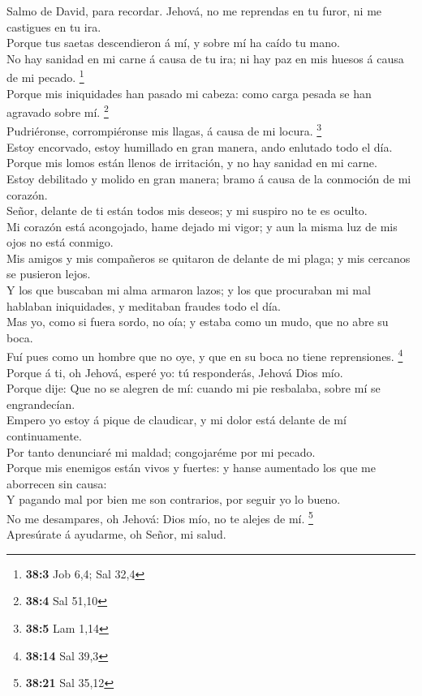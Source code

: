  Salmo de David, para recordar. Jehová, no me reprendas en
tu furor, ni me castigues en tu ira.\\
 Porque tus saetas descendieron á mí, y sobre mí ha caído
tu mano.\\
 No hay sanidad en mi carne á causa de tu ira; ni hay paz
en mis huesos á causa de mi pecado. \footnote{\textbf{38:3} Job 6,4; Sal
  32,4}\\
 Porque mis iniquidades han pasado mi cabeza: como carga
pesada se han agravado sobre mí. \footnote{\textbf{38:4} Sal 51,10}\\
 Pudriéronse, corrompiéronse mis llagas, á causa de mi
locura. \footnote{\textbf{38:5} Lam 1,14}\\
 Estoy encorvado, estoy humillado en gran manera, ando
enlutado todo el día.\\
 Porque mis lomos están llenos de irritación, y no hay
sanidad en mi carne.\\
 Estoy debilitado y molido en gran manera; bramo á causa
de la conmoción de mi corazón.\\
 Señor, delante de ti están todos mis deseos; y mi suspiro
no te es oculto.\\
 Mi corazón está acongojado, hame dejado mi vigor; y aun
la misma luz de mis ojos no está conmigo.\\
 Mis amigos y mis compañeros se quitaron de delante de mi
plaga; y mis cercanos se pusieron lejos.\\
 Y los que buscaban mi alma armaron lazos; y los que
procuraban mi mal hablaban iniquidades, y meditaban fraudes todo el
día.\\
 Mas yo, como si fuera sordo, no oía; y estaba como un
mudo, que no abre su boca.\\
 Fuí pues como un hombre que no oye, y que en su boca no
tiene reprensiones. \footnote{\textbf{38:14} Sal 39,3}\\
 Porque á ti, oh Jehová, esperé yo: tú responderás,
Jehová Dios mío.\\
 Porque dije: Que no se alegren de mí: cuando mi pie
resbalaba, sobre mí se engrandecían.\\
 Empero yo estoy á pique de claudicar, y mi dolor está
delante de mí continuamente.\\
 Por tanto denunciaré mi maldad; congojaréme por mi
pecado.\\
 Porque mis enemigos están vivos y fuertes: y hanse
aumentado los que me aborrecen sin causa:\\
 Y pagando mal por bien me son contrarios, por seguir yo
lo bueno.\\
 No me desampares, oh Jehová: Dios mío, no te alejes de
mí. \footnote{\textbf{38:21} Sal 35,12}\\
 Apresúrate á ayudarme, oh Señor, mi salud.


